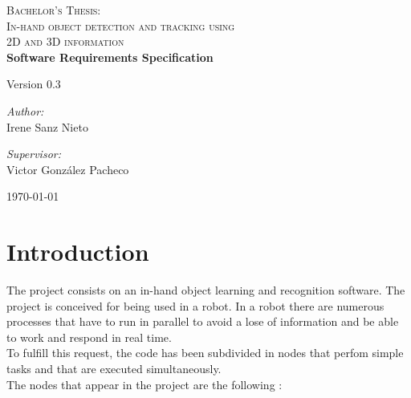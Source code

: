 \documentclass{article}
\begin{document}
\begin{titlepage}

\begin{center}
\textsc{\huge Bachelor's Thesis:\\[0.5cm]In-hand object detection and tracking using\\[0.5cm]2D and 3D
information }\\[4cm]


{\Huge\bfseries{Software Requirements Specification}\\[2cm]}

\Large{Version 0.3}
\\[11cm]


\begin{minipage}{0.55\textwidth}
\begin{flushleft} \large
\emph{Author:}\\
Irene Sanz Nieto\\
\end{flushleft}
\end{minipage}
\begin{minipage}{0.4\textwidth}
\begin{flushright} \large
\emph{Supervisor:}\\
Victor González Pacheco\end{flushright}\end{minipage}\vfill

{\large \today}

\end{center}
\end{titlepage}

%
\newpage
%
\tableofcontents
\newpage


\section{Introduction}
\hspace{0.5cm}The project consists on an in-hand object learning and recognition software. 
The project is conceived for being used in a robot. In a robot there are numerous processes that have to run in parallel to avoid a lose of information and be able to work and respond in real time. 
\\
To fulfill this request, the code has been subdivided in nodes that perfom simple tasks and that are executed simultaneously. 
\\
The nodes that appear in the project are the following : 
\end{document}
